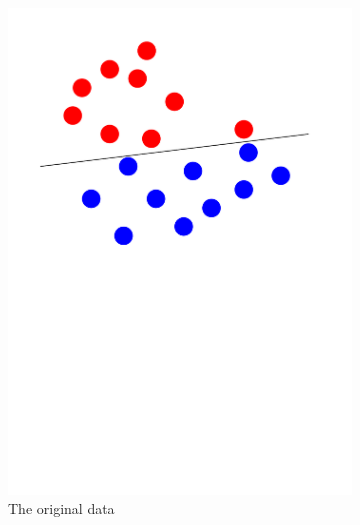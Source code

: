 \begin{figure}[h!]
	\centering
	\begin{subfigure}{.4\textwidth}
		\includegraphics[width=\textwidth]{original}
		\caption{The original data}
		\label{fig:original}
	\end{subfigure}
	\begin{subfigure}{.4\textwidth}

\end{subfigure}
\end{figure}
